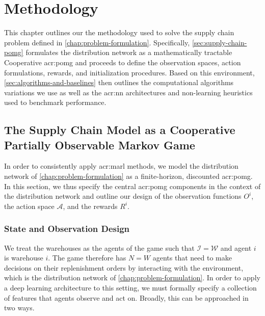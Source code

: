 \chapter{Methodology}
\label{chap: methodology}

This chapter outlines our the methodology used to solve the supply chain problem defined in \autoref{chap:problem-formulation}. Specifically, \autoref{sec:supply-chain-pomg} formulates the distribution network as a mathematically tractable Cooperative \gls{acr:pomg} and proceeds to define the observation spaces, action formulations, rewards, and initialization procedures. Based on this environment, \autoref{sec:algorithms-and-baselines} then outlines the computational algorithms variations we use as well as the \gls{acr:nn} architectures and non-learning heuristics used to benchmark performance.\\

\section{The Supply Chain Model as a Cooperative Partially Observable Markov Game}
\label{sec:supply-chain-pomg}
In order to consistently apply \gls{acr:marl} methods, we model the distribution network of \autoref{chap:problem-formulation} as a finite-horizon, discounted \gls{acr:pomg}. In this section, we thus specify the central \gls{acr:pomg} components in the context of the distribution network and outline our design of the observation functions $O^i$, the action space $\mathcal{A}$, and the rewards $R^i$.\\

\subsection{State and Observation Design}
\label{subsec:observation-design}
We treat the warehouses as the agents of the game such that $\mathcal{I}=\mathcal{W}$ and agent $i$ is warehouse $i$. The game therefore has $N=W$ agents that need to make decisions on their replenishment orders by interacting with the environment, which is the distribution network of \autoref{chap:problem-formulation}. In order to apply a deep learning architecture to this setting, we must formally specify a collection of features that agents observe and act on. Broadly, this can be approached in two ways. 

